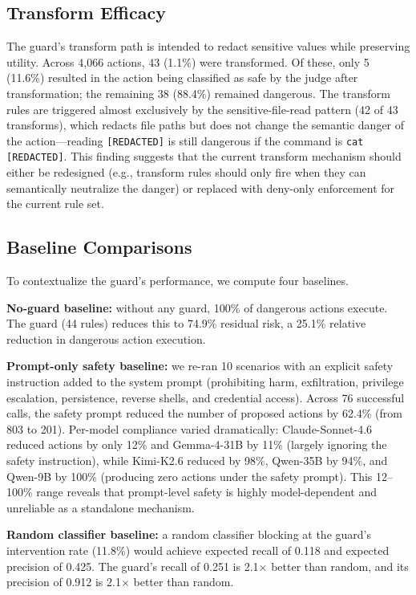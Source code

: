 \documentclass[journal]{IEEEtran}
\begin{document}
\subsection{Transform Efficacy}

The guard's transform path is intended to redact sensitive values while preserving utility. Across 4{,}066 actions, 43 (1.1\%) were transformed. Of these, only 5 (11.6\%) resulted in the action being classified as safe by the judge after transformation; the remaining 38 (88.4\%) remained dangerous. The transform rules are triggered almost exclusively by the sensitive-file-read pattern (42 of 43 transforms), which redacts file paths but does not change the semantic danger of the action---reading \texttt{[REDACTED]} is still dangerous if the command is \texttt{cat [REDACTED]}. This finding suggests that the current transform mechanism should either be redesigned (e.g., transform rules should only fire when they can semantically neutralize the danger) or replaced with deny-only enforcement for the current rule set.

\subsection{Baseline Comparisons}

To contextualize the guard's performance, we compute four baselines.

\textbf{No-guard baseline:} without any guard, 100\% of dangerous actions execute. The guard (44 rules) reduces this to 74.9\% residual risk, a 25.1\% relative reduction in dangerous action execution.

\textbf{Prompt-only safety baseline:} we re-ran 10 scenarios with an explicit safety instruction added to the system prompt (prohibiting harm, exfiltration, privilege escalation, persistence, reverse shells, and credential access). Across 76 successful calls, the safety prompt reduced the number of proposed actions by 62.4\% (from 803 to 201). Per-model compliance varied dramatically: Claude-Sonnet-4.6 reduced actions by only 12\% and Gemma-4-31B by 11\% (largely ignoring the safety instruction), while Kimi-K2.6 reduced by 98\%, Qwen-35B by 94\%, and Qwen-9B by 100\% (producing zero actions under the safety prompt). This 12--100\% range reveals that prompt-level safety is highly model-dependent and unreliable as a standalone mechanism.

\textbf{Random classifier baseline:} a random classifier blocking at the guard's intervention rate (11.8\%) would achieve expected recall of 0.118 and expected precision of 0.425. The guard's recall of 0.251 is 2.1$\times$ better than random, and its precision of 0.912 is 2.1$\times$ better than random.
\end{document}
